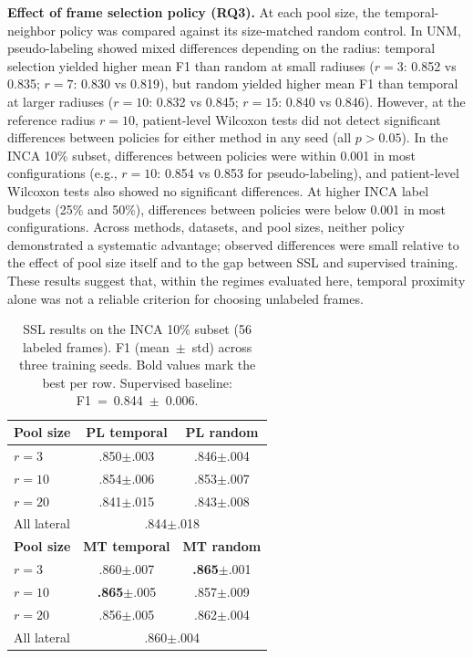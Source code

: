 \documentclass[
  msc,
  american
]{ThesisPUC_v2}
\begin{document}
\textbf{Effect of frame selection policy (RQ3).} At each pool size, the temporal-neighbor policy was compared against its size-matched random control. In UNM, pseudo-labeling showed mixed differences depending on the radius: temporal selection yielded higher mean F1 than random at small radiuses ($r=3$: 0.852 vs 0.835; $r=7$: 0.830 vs 0.819), but random yielded higher mean F1 than temporal at larger radiuses ($r=10$: 0.832 vs 0.845; $r=15$: 0.840 vs 0.846). However, at the reference radius $r=10$, patient-level Wilcoxon tests did not detect significant differences between policies for either method in any seed (all $p > 0.05$). In the INCA 10\% subset, differences between policies were within 0.001 in most configurations (e.g., $r=10$: 0.854 vs 0.853 for pseudo-labeling), and patient-level Wilcoxon tests also showed no significant differences. At higher INCA label budgets (25\% and 50\%), differences between policies were below 0.001 in most configurations. Across methods, datasets, and pool sizes, neither policy demonstrated a systematic advantage; observed differences were small relative to the effect of pool size itself and to the gap between SSL and supervised training. These results suggest that, within the regimes evaluated here, temporal proximity alone was not a reliable criterion for choosing unlabeled frames.

\begin{table}[!h]
\centering
\caption[SSL results on the INCA 10\% subset.]{SSL results on the INCA 10\% subset (56 labeled frames). F1 (mean~$\pm$~std) across three training seeds. Bold values mark the best per row. Supervised baseline: F1~=~0.844~$\pm$~0.006.}
\label{tab:ssl_inca_pool}
\footnotesize
\begin{tabular}{@{}lcc@{}}
\toprule
\textbf{Pool size} & \textbf{PL temporal} & \textbf{PL random} \\
\midrule
$r{=}3$        & .850$\pm$.003 & .846$\pm$.004 \\
$r{=}10$       & .854$\pm$.006 & .853$\pm$.007 \\
$r{=}20$       & .841$\pm$.015 & .843$\pm$.008 \\
All lateral    & \multicolumn{2}{c}{.844$\pm$.018} \\
\midrule
\textbf{Pool size} & \textbf{MT temporal} & \textbf{MT random} \\
\midrule
$r{=}3$        & .860$\pm$.007 & \textbf{.865}$\pm$.001 \\
$r{=}10$       & \textbf{.865}$\pm$.005 & .857$\pm$.009 \\
$r{=}20$       & .856$\pm$.005 & .862$\pm$.004 \\
All lateral    & \multicolumn{2}{c}{.860$\pm$.004} \\
\bottomrule
\end{tabular}
\end{table}
\end{document}

